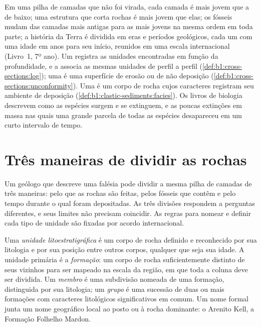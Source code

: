 \begin{recall}
Em uma pilha de camadas que não foi virada, cada camada é mais jovem que a de baixo; uma
estrutura que corta rochas é mais jovem que elas; os fósseis mudam das camadas mais antigas
para as mais jovens na mesma ordem em toda parte; a história da Terra é dividida em eras e
períodos geológicos, cada um com uma idade em anos para seu início, reunidos em uma escala
internacional (Livro~1, 7º ano). Um  registra as unidades encontradas em
função da profundidade, e a  associa as mesmas unidades de perfil a perfil
(\cref{def:b1:cross-sections:log}); uma  é uma superfície de erosão ou de não
deposição (\cref{def:b1:cross-sections:unconformity}). Uma  é um corpo de
rocha cujos caracteres registram seu ambiente de deposição
(\cref{def:b1:clastic-sediments:facies}). Os livros de biologia descrevem como as espécies
surgem e se extinguem, e as poucas extinções em massa nas quais uma grande parcela de todas
as espécies desapareceu em um curto intervalo de tempo.
\end{recall}

\section{Três maneiras de dividir as rochas}\label{sec:b1:stratigraphic-scale:three}

Um geólogo que descreve uma falésia pode dividir a mesma pilha de camadas de três maneiras:
pelo que as rochas são feitas, pelos fósseis que contêm e pelo tempo durante o qual foram
depositadas. As três divisões respondem a perguntas diferentes, e seus limites não precisam
coincidir. As regras para nomear e definir cada tipo de unidade são fixadas por acordo
internacional.

\begin{definition}\label{def:b1:stratigraphic-scale:lithostratigraphy}
Uma \emph{unidade litoestratigráfica} é um corpo de rocha
definido e reconhecido por sua litologia e por sua posição entre outros corpos, qualquer que
seja sua idade. A unidade primária é a \emph{formação}:
um corpo de rocha suficientemente distinto de seus vizinhos para ser mapeado na escala da
região, em que toda a coluna deve ser dividida. Um \emph{membro} é uma subdivisão nomeada de uma formação, distinguida por sua litologia;
um \emph{grupo} é uma sucessão de duas ou mais formações
com caracteres litológicos significativos em comum. Um nome formal junta um nome geográfico
local ao posto ou à rocha dominante: o Arenito Kell, a Formação Folhelho Mardon.
\end{definition}

